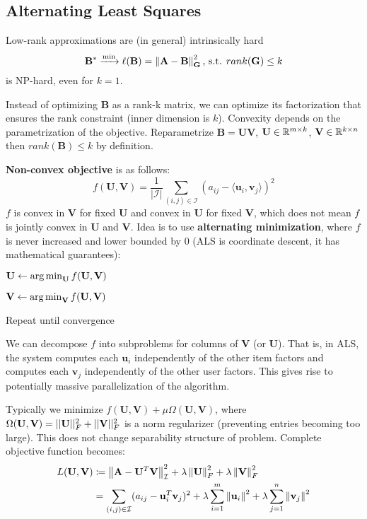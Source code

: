 \documentclass[12pt]{article}
\begin{document}
\subsection{Alternating Least Squares}
\par Low-rank approximations are (in general) intrinsically hard
\[ \mathbf{B}^* \xrightarrow{\min} \ell(\mathbf{B}) = \left\lVert\mathbf{A - B}\right\rVert^2_{\mathbf{G}} \text{, s.t. } rank(\mathbf{G}) \leq k \]
is NP-hard, even for $k=1$.
\par Instead of optimizing $\mathbf{B}$ as a rank-k matrix, we can optimize its factorization that ensures the rank constraint (inner dimension is $k$). Convexity depends on the parametrization of the objective. Reparametrize $\mathbf{B = UV}$, $\mathbf{U}\in \mathbb{R}^{m\times k}$, $\mathbf{V}\in \mathbb{R}^{k\times n}$ then $rank(\mathbf{B}) \leq k$ by definition.
\par \textbf{Non-convex objective} is as follows:
\[ f(\mathbf{U,V}) = \frac{1}{|\mathcal{I}|} \sum_{(i,j)\in\mathcal{I}} (a_{ij} - \langle \mathbf{u}_i, \mathbf{v}_j \rangle)^2 \]
$f$ is convex in $\mathbf{V}$ for fixed $\mathbf{U}$ and convex in $\mathbf{U}$ for fixed $\mathbf{V}$, which does not mean $f$ is jointly convex in $\mathbf{U}$ and $\mathbf{V}$. Idea is to use \textbf{alternating minimization}, where $f$ is never increased and lower bounded by $0$ (ALS is coordinate descent, it has mathematical guarantees):
\ulb
\item $\mathbf{U} \leftarrow \operatorname*{arg\,min}_{\mathbf{U}} f(\mathbf{U,V})$
\item $\mathbf{V} \leftarrow \operatorname*{arg\,min}_{\mathbf{V}} f(\mathbf{U,V})$
\item Repeat until convergence
\ule
\par We can decompose $f$ into subproblems for columns of $\mathbf{V}$ (or $\mathbf{U}$). That is, in ALS, the system computes each $\mathbf{u}_i$ independently of the other item factors and computes each $\mathbf{v}_j$ independently of the other user factors. This gives rise to potentially massive parallelization of the algorithm.
\par Typically we minimize $f(\mathbf{U,V}) + \mu \Omega(\mathbf{U,V})$, where $\Omega(\mathbf{U,V}) = ||\mathbf{U}||_F^2 + ||\mathbf{V}||_F^2$ is a norm regularizer (preventing entries becoming too large). This does not change separability structure of problem. Complete objective function becomes:
\begin{equation*}
\begin{split}
L(\mathbf{U,V}) &\coloneqq \left\lVert\mathbf{A}-\mathbf{U}^T\mathbf{V}\right\rVert^2_{\mathcal{I}} + \lambda\left\lVert\mathbf{U}\right\rVert^2_F + \lambda\left\lVert\mathbf{V}\right\rVert^2_F \\
&= \sum_{(i,j)\in\mathcal{I}} (a_{ij} - \mathbf{u}_i^T\mathbf{v}_j)^2 + \lambda\sum_{i=1}^m \left\lVert\mathbf{u}_i\right\rVert^2 + \lambda\sum_{j=1}^n \left\lVert\mathbf{v}_j\right\rVert^2
\end{split}
\end{equation*}
\end{document}
